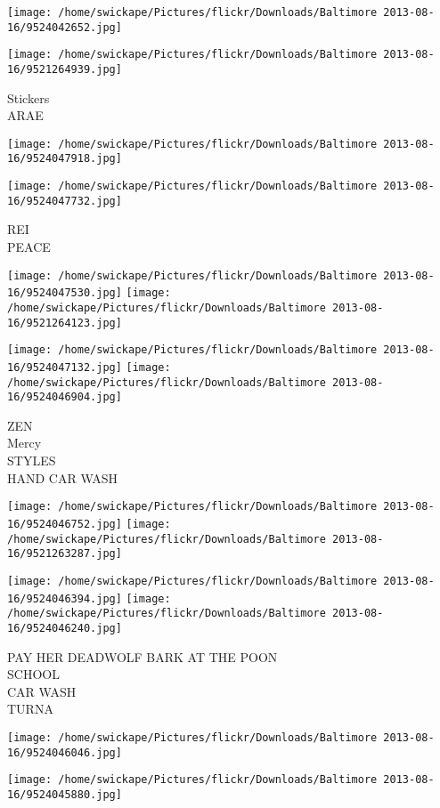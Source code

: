 \documentclass[10pt,letterpaper]{article}
\begin{document}
\texttt{[image: /home/swickape/Pictures/flickr/Downloads/Baltimore 2013-08-16/9524042652.jpg]}

\vspace{0.25in}
\texttt{[image: /home/swickape/Pictures/flickr/Downloads/Baltimore 2013-08-16/9521264939.jpg]}

Stickers\\
ARAE
\pagebreak

\texttt{[image: /home/swickape/Pictures/flickr/Downloads/Baltimore 2013-08-16/9524047918.jpg]}

\vspace{0.25in}
\texttt{[image: /home/swickape/Pictures/flickr/Downloads/Baltimore 2013-08-16/9524047732.jpg]}

REI\\
PEACE
\pagebreak

\texttt{[image: /home/swickape/Pictures/flickr/Downloads/Baltimore 2013-08-16/9524047530.jpg]}
\texttt{[image: /home/swickape/Pictures/flickr/Downloads/Baltimore 2013-08-16/9521264123.jpg]}

\texttt{[image: /home/swickape/Pictures/flickr/Downloads/Baltimore 2013-08-16/9524047132.jpg]}
\texttt{[image: /home/swickape/Pictures/flickr/Downloads/Baltimore 2013-08-16/9524046904.jpg]}

ZEN\\
Mercy\\
STYLES\\
HAND CAR WASH
\pagebreak

\texttt{[image: /home/swickape/Pictures/flickr/Downloads/Baltimore 2013-08-16/9524046752.jpg]}
\texttt{[image: /home/swickape/Pictures/flickr/Downloads/Baltimore 2013-08-16/9521263287.jpg]}

\texttt{[image: /home/swickape/Pictures/flickr/Downloads/Baltimore 2013-08-16/9524046394.jpg]}
\texttt{[image: /home/swickape/Pictures/flickr/Downloads/Baltimore 2013-08-16/9524046240.jpg]}

PAY HER DEADWOLF BARK AT THE POON\\
SCHOOL\\
CAR WASH\\
TURNA
\pagebreak

\texttt{[image: /home/swickape/Pictures/flickr/Downloads/Baltimore 2013-08-16/9524046046.jpg]}

\vspace{0.25in}
\texttt{[image: /home/swickape/Pictures/flickr/Downloads/Baltimore 2013-08-16/9524045880.jpg]}
\end{document}
